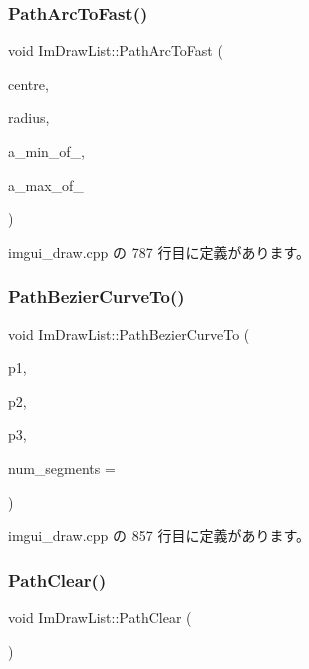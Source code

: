 \subsubsection{\texorpdfstring{Path\+Arc\+To\+Fast()}{PathArcToFast()}}
{\footnotesize\ttfamily void Im\+Draw\+List\+::\+Path\+Arc\+To\+Fast (\begin{DoxyParamCaption}\item[{const \mbox{\hyperlink{struct_im_vec2}{Im\+Vec2}} \&}]{centre,  }\item[{float}]{radius,  }\item[{int}]{a\+\_\+min\+\_\+of\+\_,  }\item[{int}]{a\+\_\+max\+\_\+of\+\_ }\end{DoxyParamCaption})}



 imgui\+\_\+draw.\+cpp の 787 行目に定義があります。

\mbox{\label{struct_im_draw_list_a495ca7dd4fd5a898e2414658321f4b18}} 
\subsubsection{\texorpdfstring{Path\+Bezier\+Curve\+To()}{PathBezierCurveTo()}}
{\footnotesize\ttfamily void Im\+Draw\+List\+::\+Path\+Bezier\+Curve\+To (\begin{DoxyParamCaption}\item[{const \mbox{\hyperlink{struct_im_vec2}{Im\+Vec2}} \&}]{p1,  }\item[{const \mbox{\hyperlink{struct_im_vec2}{Im\+Vec2}} \&}]{p2,  }\item[{const \mbox{\hyperlink{struct_im_vec2}{Im\+Vec2}} \&}]{p3,  }\item[{int}]{num\+\_\+segments = {} }\end{DoxyParamCaption})}



 imgui\+\_\+draw.\+cpp の 857 行目に定義があります。

\mbox{\label{struct_im_draw_list_ae9ad5f4d638b1bfd9383618dc60e3f18}} 
\subsubsection{\texorpdfstring{Path\+Clear()}{PathClear()}}
{\footnotesize\ttfamily void Im\+Draw\+List\+::\+Path\+Clear (\begin{DoxyParamCaption}{ }\end{DoxyParamCaption})\hspace{0.3cm}{\ttfamily [inline]}}



